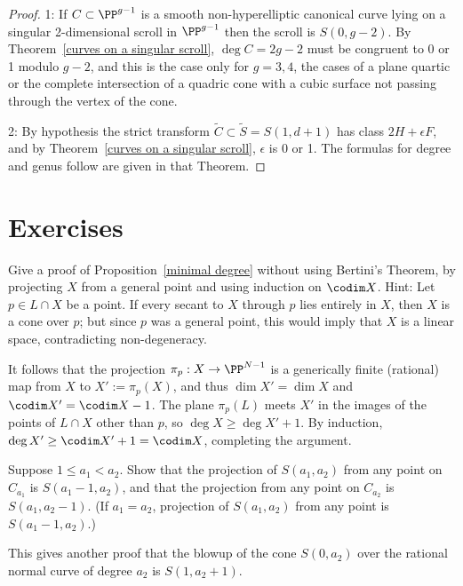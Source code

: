 \begin{proof} 1: If $C\subset \PP^{g-1}$ is a smooth non-hyperelliptic canonical curve lying on a singular 2-dimensional scroll in $\PP^{g-1}$
then the scroll is $S(0, g-2)$. By Theorem~\ref{curves on a singular scroll}, $\deg C = 2g-2$ must be congruent
to 0 or 1 modulo $g-2$, and this is the case only for $g=3,4$, the cases of a plane quartic or the complete intersection
of a quadric cone with a cubic surface not passing through the vertex of the cone.

2: By hypothesis the strict transform $\widetilde C\subset  \widetilde S = S(1, d+1)$
has class $2H+\epsilon F$,  and by Theorem~\ref{curves on a singular scroll}, $\epsilon$ is 0 or 1.
The formulas for degree and genus follow are given in that Theorem.
\end{proof}
\section{Exercises}

\begin{exercise}
 Give a proof of Proposition~\ref{minimal degree} without using Bertini's Theorem, by projecting $X$ from a general point and using induction on $\codim X$.
 Hint: Let $p\in L\cap X$ be a point. If every secant to $X$ through $p$ lies entirely in $X$, then $X$ is a cone over $p$; but since $p$ was a general point, this would imply that $X$ is a linear space, contradicting non-degeneracy. 

It follows that the projection $\pi_{p}:X \to \PP^{N-1}$ is a generically finite (rational) map from $X$ to $X' := \pi_{p}(X)$,
and thus $\dim X' = \dim X$ and $\codim X' = \codim X-1$. The plane 
$\pi_{p}(L)$ meets $X'$ in the images of the points of $L\cap X$ other than $p$, so
$\deg X\geq \deg X'+1$. By induction, $\deg X' \geq \codim X'+1 = \codim X$, completing the argument.
\end{exercise}

\begin{exercise}\label{special projections}
Suppose $1\leq a_1 < a_2$. Show that the projection of $S(a_1,a_2)$ from any point on $C_{a_1}$ is 
$S(a_1-1, a_2)$, and that the projection from any point on $C_{a_2}$ is $S(a_1, a_2-1)$. (If $a_1 = a_2$, projection of $S(a_1,a_2)$ from any point is $S(a_1-1, a_2)$.)

This gives another proof that the blowup of the cone $S(0,a_2)$ over the rational normal curve of degree $a_2$ is $S(1,a_2+1)$.  
\end{exercise}

